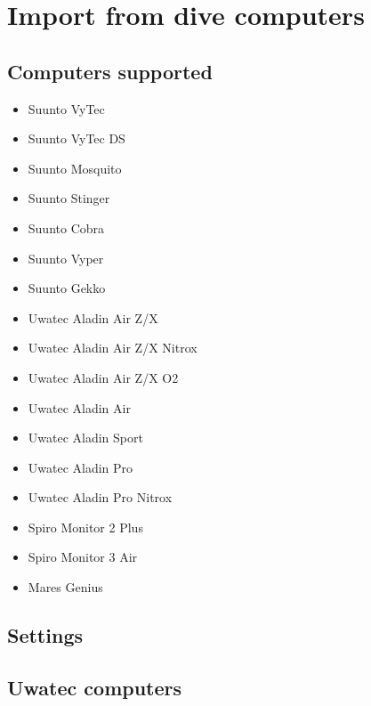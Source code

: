 \documentclass[10pt,a4paper,titlepage]{report}
\begin{document}
\section{Import from dive computers}
\subsection{Computers supported}
\begin{itemize}
	\item Suunto VyTec
	\item Suunto VyTec DS
	\item Suunto Mosquito
	\item Suunto Stinger
	\item Suunto Cobra
	\item Suunto Vyper
	\item Suunto Gekko
	\item Uwatec Aladin Air Z/X
	\item Uwatec Aladin Air Z/X Nitrox
	\item Uwatec Aladin Air Z/X O2
	\item Uwatec Aladin Air
	\item Uwatec Aladin Sport
	\item Uwatec Aladin Pro
	\item Uwatec Aladin Pro Nitrox
	\item Spiro Monitor 2 Plus
	\item Spiro Monitor 3 Air
	\item Mares Genius
\end{itemize}
\subsection{Settings}
\subsection {Uwatec computers}
\end{document}
